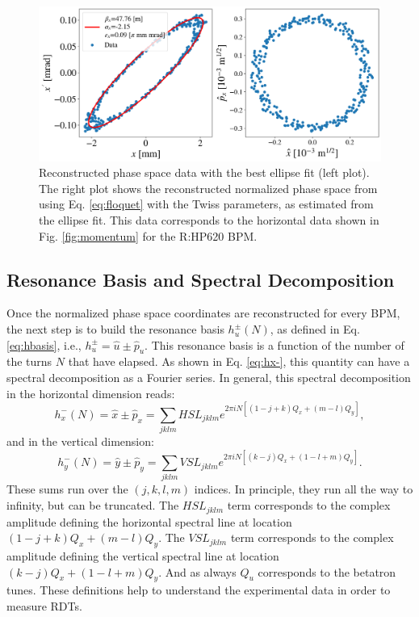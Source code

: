 \begin{figure}[H]
    \centering
    \includegraphics[width=\columnwidth]{chapter4/ellipse_data.png}
    \caption{Reconstructed phase space data with the best ellipse fit (left plot). The right plot shows the reconstructed normalized phase space from using Eq. \ref{eq:floquet} with the Twiss parameters, as estimated from the ellipse fit. This data corresponds to the horizontal data shown in Fig. \ref{fig:momentum} for the R:HP620 BPM.}
    \label{fig:ellipse}
\end{figure}

\subsection{Resonance Basis and Spectral Decomposition}

Once the normalized phase space coordinates are reconstructed for every BPM, the next step is to build the resonance basis $h_u^{\pm}(N)$, as defined in Eq. \ref{eq:hbasis}, i.e., $h_u^{\pm}=\hat{u}\pm \hat{p}_u$. This resonance basis is a function of the number of the turns $N$ that have elapsed. As shown in Eq. \ref{eq:hx-}, this quantity can have a spectral decomposition as a Fourier series. In general, this spectral decomposition in the horizontal dimension reads: 
\begin{equation}
    \label{eq:hxspect}
    h_x^{-}(N)= \hat{x} \pm \hat{p}_x = \sum_{jklm}HSL_{jklm}e^{2\pi i N \left[ \left( 1-j+k\right)Q_x+\left( m-l \right)Q_y\right]},
\end{equation}
and in the vertical dimension:
\begin{equation}
    \label{eq:hyspect}
    h_y^{-}(N)= \hat{y} \pm \hat{p}_y = \sum_{jklm}VSL_{jklm}e^{2\pi i N \left[ \left( k-j\right)Q_x+\left(1-l+m \right)Q_y\right]}.
\end{equation}
These sums run over the $(j,k,l,m)$ indices. In principle, they run all the way to infinity, but can be truncated. The $HSL_{jklm}$ term corresponds to the complex amplitude defining the horizontal spectral line at location $(1-j+k)Q_x+(m-l)Q_y$. The $VSL_{jklm}$ term corresponds to the complex amplitude defining the vertical spectral line at location $(k-j)Q_x+(1-l+m)Q_y$. And as always $Q_u$ corresponds to the betatron tunes. These definitions help to understand the experimental data in order to measure RDTs.

